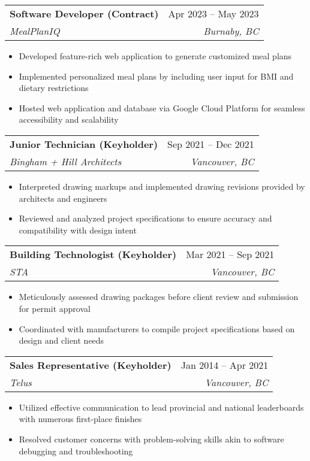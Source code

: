\documentclass[letterpaper,11pt]{article}
\makeatletter
\newcommand{\resumeItem}[1]{
  \item\small{
    {#1 \vspace{-2pt}}
  }
}
\newcommand{\resumeSubheading}[4]{
  \vspace{-2pt}\item
    \begin{tabular*}{0.97\textwidth}[t]{l@{\extracolsep{\fill}}r}
      \textbf{#1} & #2 \\
      \textit{\small#3} & \textit{\small #4} \\
    \end{tabular*}\vspace{-7pt}
}
\newcommand{\resumeSubSubheading}[2]{
    \item
    \begin{tabular*}{0.97\textwidth}{l@{\extracolsep{\fill}}r}
      \textit{\small#1} & \textit{\small #2} \\
    \end{tabular*}\vspace{-7pt}
}
\newcommand{\resumeSubHeadingListEnd}{\end{itemize}}
\newcommand{\resumeItemListStart}{\begin{itemize}}
\newcommand{\resumeItemListEnd}{\end{itemize}\vspace{-5pt}}
\makeatother
\begin{document}
\resumeSubheading
{Software Developer (Contract)}{Apr 2023 -- May 2023}
{MealPlanIQ}{Burnaby, BC}
\resumeItemListStart
\resumeItem{Developed feature-rich web application to generate customized meal plans}
\resumeItem{Implemented personalized meal plans by including user input for BMI and dietary restrictions}
\resumeItem{Hosted web application and database via Google Cloud Platform for seamless accessibility and scalability}
\resumeItemListEnd

\resumeSubheading
{Junior Technician (Keyholder)}{Sep 2021 -- Dec 2021}
{Bingham + Hill Architects}{Vancouver, BC}
\resumeItemListStart
\resumeItem{Interpreted drawing markups and implemented drawing revisions provided by architects and engineers}
\resumeItem{Reviewed and analyzed project specifications to ensure accuracy and compatibility with design intent}
\resumeItemListEnd

\resumeSubheading
{Building Technologist (Keyholder)}{Mar 2021 -- Sep 2021}
{STA}{Vancouver, BC}
\resumeItemListStart
\resumeItem{Meticulously assessed drawing packages before client review and submission for permit approval}
\resumeItem{Coordinated with manufacturers to compile project specifications based on design and client needs}
\resumeItemListEnd

\resumeSubheading
{Sales Representative (Keyholder)}{Jan 2014 -- Apr 2021}
{Telus}{Vancouver, BC}
\resumeItemListStart
\resumeItem{Utilized effective communication to lead provincial and national leaderboards with numerous first-place finishes}
\resumeItem{Resolved customer concerns with problem-solving skills akin to software debugging and troubleshooting}
\resumeItemListEnd



\end{document}
